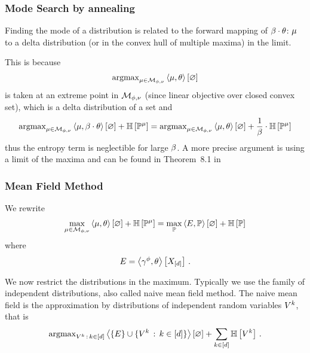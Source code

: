 \subsubsection{Mode Search by annealing}

Finding the mode of a distribution is related to the forward mapping of $\beta\cdot\theta$: 
$\mu$ to a delta distribution (or in the convex hull of multiple maxima) in the limit.

This is because 
\begin{align*}
	\mathrm{argmax}_{\mu\in\mathcal{M}_{\phi,\nu}}  \left\langle \mu,\theta\right\rangle \left[ \varnothing \right]
\end{align*}
is taken at an extreme point in $\mathcal{M}_{\phi,\nu}$ (since linear objective over closed convex set), which is a delta distribution of a set and
\begin{align*}
	\mathrm{argmax}_{\mu\in\mathcal{M}_{\phi,\nu}}  \left\langle \mu,\beta\cdot\theta\right\rangle \left[ \varnothing \right]+ \mathbb{H}\left[\mathbb{P}^{\mu}\right] 
	= 
	\mathrm{argmax}_{\mu\in\mathcal{M}_{\phi,\nu}}  \left\langle \mu,\theta\right\rangle \left[ \varnothing \right] + \frac{1}{\beta} \cdot \mathbb{H}\left[\mathbb{P}^{\mu}\right] 	
\end{align*}
thus the entropy term is neglectible for large $\beta$.
A more precise argument is using a limit of the maxima and can be found in Theorem~8.1 in \cite{wainwright_graphical_2008}





\subsubsection{Mean Field Method}

We rewrite 
\begin{align*}
	\max_{\mu\in\mathcal{M}_{\phi,\nu}}  \left\langle \mu,\theta\right\rangle \left[ \varnothing \right] + \mathbb{H}\left[\mathbb{P}^{\mu}\right] 
	=
	\max_{\mathbb{P}} \left\langle E,\mathbb{P}\right\rangle \left[ \varnothing \right] + \mathbb{H}\left[\mathbb{P}\right]
\end{align*}
where
	\[ E = \left\langle \gamma^{\phi},\theta\right\rangle \left[ X_{[d]} \right] \, . \]

We now restrict the distributions in the maximum.
Typically we use the family of independent distributions, also called naive mean field method.
The naive mean field is the approximation by distributions of independent random variables $V^{k}$, that is
\begin{align*}
	\mathrm{argmax}_{V^{k} \, : \, k\in[d]} \left\langle \{E\} \cup \{V^{k} \, : \, k\in[d]\}\right\rangle \left[ \varnothing \right]
	+ \sum_{k\in[d]} \mathbb{H}\left[V^{k}\right] \, . 
\end{align*}


